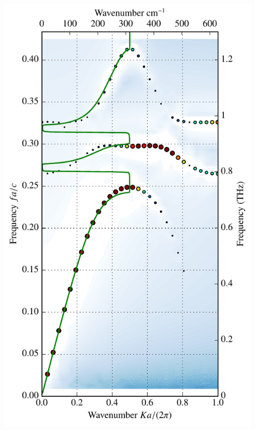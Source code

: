 \documentclass[t]{beamer} \usepackage[english]{babel} \usepackage[utf8]{inputenc} \usetheme{Frankfurt} %
\begin{document}
\begin{frame}[plain]{}
\begin{columns}[T]
\begin{column}{.55\textwidth}
	\end{column}%
	\begin{column}{.45\textwidth}
		\vspace{-1mm}\includegraphics[height=\paperheight]{../img-cdh-new/CDH_SRRArray_08.pdf} 
	\end{column}
\end{columns}
\end{frame} 		%
\end{document}
